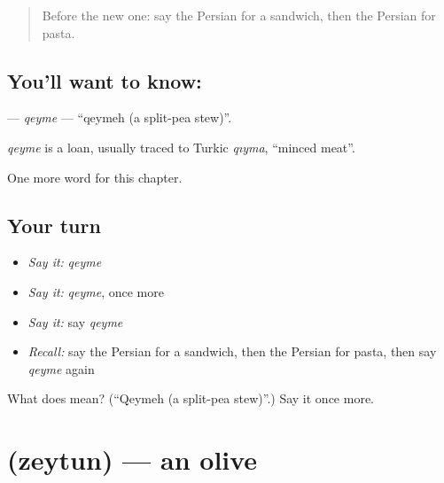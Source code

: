 \label{lesson:FA-C205-qeyme}



\begin{quote}
Before the new one: say the Persian for a sandwich, then the Persian for pasta.
\end{quote}

\subsection*{You'll want to know: }
\textbf{} — \emph{qeyme} — \textquotedblleft{}qeymeh (a split-pea stew)\textquotedblright{}.

\begin{cousinweb}
\emph{qeyme} is a loan, usually traced to Turkic \emph{qıyma}, \textquotedblleft{}minced meat\textquotedblright{}.
\end{cousinweb}

\begin{grammarlens}[title={What you've built}]
One more word for this chapter.
\end{grammarlens}

\subsection*{Your turn}
\begin{itemize}
\raggedright
  \item \emph{Say it:} \emph{qeyme}
  \item \emph{Say it:} \emph{qeyme}, once more
  \item \emph{Say it:} say \emph{qeyme}
  \item \emph{Recall:} say the Persian for a sandwich, then the Persian for pasta, then say \emph{qeyme} again
\end{itemize}

\begin{tcolorbox}[breakable,colback=teal!4,colframe=teal!35!black,title={Before you move on}]
What does  mean? (\textquotedblleft{}Qeymeh (a split-pea stew)\textquotedblright{}.) Say it once more.
\end{tcolorbox}
\section[\texorpdfstring{\fa{زیتون} (zeytun)}{زیتون (zeytun)}]{ (zeytun) — an olive}

\label{lesson:FA-C205-zeytun}



